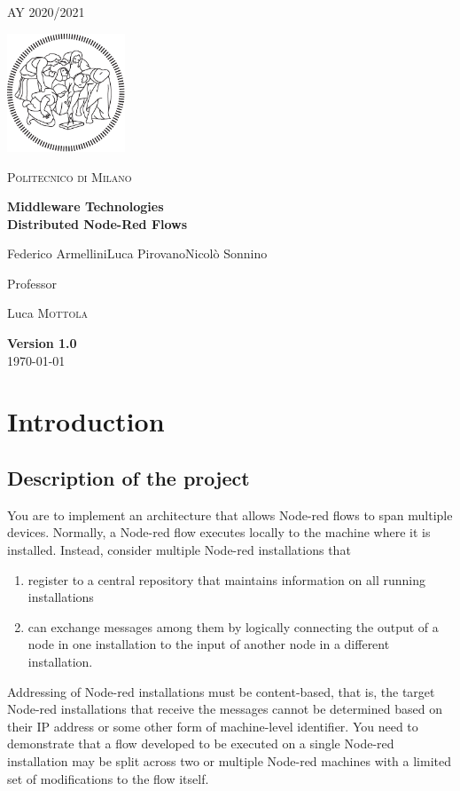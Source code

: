 \documentclass[table, 12pt]{article}
\begin{document}
\begin{titlepage}
    \centering
    {\scshape\large AY 2020/2021 \par}
    \vfill
    \includegraphics[width=100pt]{assets/logo-polimi-new}\par\vspace{1cm}
    {\scshape\LARGE Politecnico di Milano \par}
    \vspace{1.5cm}
    {\huge\bfseries Middleware Technologies\\Distributed Node-Red Flows\par}
    \vspace{2cm}
    {\Large {Federico Armellini\quad Luca Pirovano\quad Nicolò Sonnino}\par}
    \vfill
    {\large Professor\par
        Luca \textsc{Mottola}}
    \vfill
    {\large \textbf{Version 1.0}\\ \today \par}
\end{titlepage}
\thispagestyle{plain}
\mbox{}
\newpage
{}
\tableofcontents
\newpage
{}
\section{Introduction}
\subsection{Description of the project}
You are to implement an architecture that allows Node-red flows to span multiple devices. Normally, a
Node-red flow executes locally to the machine where it is installed. Instead, consider multiple Node-red
installations that 
\begin{enumerate}
    \item register to a central repository that maintains information on all running installations
    \item can exchange messages among them by logically connecting the output of a node in one installation to the input
    of another node in a different installation.
\end{enumerate}
Addressing of Node-red installations must be content-based, that is,
the target Node-red installations that receive the messages cannot be determined based on their IP address or
some other form of machine-level identifier. You need to demonstrate that a flow developed to be executed on a
single Node-red installation may be split across two or multiple Node-red machines with a limited set of
modifications to the flow itself.
\end{document}
